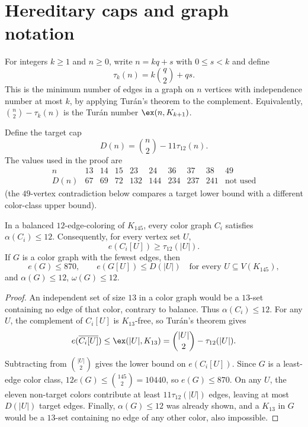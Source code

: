 \section{Hereditary caps and graph notation}
\label{sec:setup}

For integers $k\geq1$ and $n\geq0$, write $n=kq+s$ with $0\leq s<k$ and define
\[
\tau_k(n)=k\binom{q}{2}+qs.
\]
This is the minimum number of edges in a graph on $n$ vertices with independence number at most $k$, by applying Tur\'an's theorem \cite{Turan1941} to the complement. Equivalently, $\binom{n}{2}-\tau_k(n)$ is the Tur\'an number $\ex(n,K_{k+1})$.

Define the target cap
\[
D(n)=\binom{n}{2}-11\tau_{12}(n).
\]
The values used in the proof are
\[
\begin{array}{c|rrrrrrrrr}
n&13&14&15&23&24&36&37&38&49\\ \hline
D(n)&67&69&72&132&144&234&237&241&\text{not used}
\end{array}
\]
(the $49$-vertex contradiction below compares a target lower bound with a different color-class upper bound).

\begin{lemma}
\label{lem:caps}
In a balanced $12$-edge-coloring of $K_{145}$, every color graph $C_i$ satisfies $\alpha(C_i)\leq12$. Consequently, for every vertex set $U$,
\[
e(C_i[U])\geq\tau_{12}(|U|).
\]
If $G$ is a color graph with the fewest edges, then
\[
e(G)\leq870,\qquad
e(G[U])\leq D(|U|)\quad\text{for every }U\subseteq V(K_{145}),
\]
and $\alpha(G)\leq12$, $\omega(G)\leq12$.
\end{lemma}

\begin{proof}
An independent set of size $13$ in a color graph would be a $13$-set containing no edge of that color, contrary to balance. Thus $\alpha(C_i)\leq12$. For any $U$, the complement of $C_i[U]$ is $K_{13}$-free, so Tur\'an's theorem gives
\[
e(\overline{C_i[U]})\leq \ex(|U|,K_{13})
=\binom{|U|}{2}-\tau_{12}(|U|).
\]
Subtracting from $\binom{|U|}{2}$ gives the lower bound on $e(C_i[U])$. Since $G$ is a least-edge color class, $12e(G)\leq\binom{145}{2}=10440$, so $e(G)\leq870$. On any $U$, the eleven non-target colors contribute at least $11\tau_{12}(|U|)$ edges, leaving at most $D(|U|)$ target edges. Finally, $\alpha(G)\leq12$ was already shown, and a $K_{13}$ in $G$ would be a $13$-set containing no edge of any other color, also impossible.
\end{proof}

